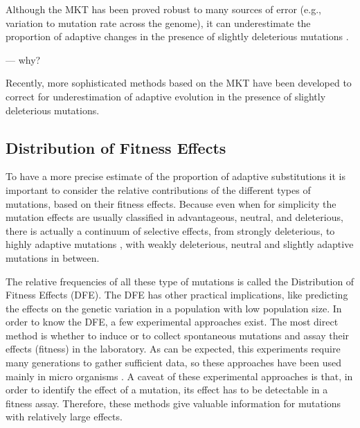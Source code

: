 Although the MKT has been proved robust to many sources of error (e.g., variation to mutation rate across the genome), it can underestimate the proportion of adaptive changes in the presence of slightly deleterious mutations
	 \citep{Messer2013,Eyre-Walker2006a}.

--- why?

Recently, more sophisticated methods based on the MKT have been developed to correct for underestimation of adaptive evolution in the presence of slightly deleterious mutations. 


\subsection{Distribution of Fitness Effects}

To have a more precise estimate of the proportion of adaptive substitutions it is important to consider the relative contributions of the different types of mutations, based on their fitness effects.
Because even when for simplicity the mutation effects are usually classified in advantageous, neutral, and deleterious, there is actually a continuum of selective effects, from strongly deleterious, 
to highly adaptive mutations	
	\citep{Eyre-Walker2007},
with weakly deleterious, neutral and slightly adaptive mutations in between.

The relative frequencies of all these type of mutations is called the Distribution of Fitness Effects (DFE).
The DFE has other practical implications, like predicting the effects on the genetic variation in a population with low population size.
In order to know the DFE, a few experimental approaches exist. The most direct method is whether to induce 
	\citep{Sanjuan2004}
or to collect
	\citep{MUKAI1964}
spontaneous mutations and assay their effects (fitness) in the laboratory.
As can be expected, this experiments require many generations to gather sufficient data, so these approaches have been used mainly in micro organisms
	\citep{Eyre-Walker2007}.
A caveat of these experimental approaches is that, in order to identify the effect of a mutation, its effect has to be detectable in a fitness assay.
Therefore, these methods give valuable information for mutations with relatively large effects.

